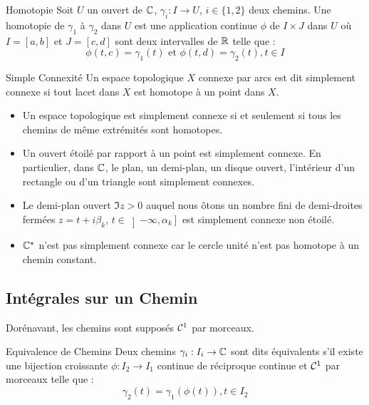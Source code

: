 \documentclass{cours}
\begin{document}
\begin{définition}{Homotopie}{}
    Soit $U$ un ouvert de $\mathbb{C}$, $\gamma_{i} : I \to U$, $i \in \{1, 2\}$ deux chemins. Une homotopie de $\gamma_{1}$ à $\gamma_{2}$ dans $U$ est une application continue $\phi$ de $I \times J$ dans $U$ où $I = \left[a, b\right]$ et $J = \left[c, d\right]$ sont deux intervalles de $\mathbb{R}$ telle que : 
    \begin{equation*}
        \phi\left(t, c\right) = \gamma_{1}\left(t\right) \text{ et } \phi\left(t, d\right) = \gamma_{2}\left(t\right), t\in I
    \end{equation*}
\end{définition}

\begin{définition}{Simple Connexité}{}
    Un espace topologique $X$ connexe par arcs est dit simplement connexe si tout lacet dans $X$ est homotope à un point dans $X$. 
\end{définition}

\begin{propositionfr}{}{}
    \begin{itemize}
        \item Un espace topologique est simplement connexe si et seulement si tous les chemins de même extrémités sont homotopes.
        \item Un ouvert étoilé par rapport à un point est simplement connexe. En particulier, dans $\mathbb{C}$, le plan, un demi-plan, un disque ouvert, l'intérieur d'un rectangle ou d'un triangle sont simplement connexes. 
        \item Le demi-plan ouvert $\Im z > 0$ auquel nous ôtons un nombre fini de demi-droites fermées $z = t +i\beta_{k}$, $t\in \left]-\infty, \alpha_{k}\right]$ est simplement connexe non étoilé. 
        \item $\mathbb{C}^{\star}$ n'est pas simplement connexe car le cercle unité n'est pas homotope à un chemin constant. 
    \end{itemize}
\end{propositionfr}

\subsection{Intégrales sur un Chemin}
Dorénavant, les chemins sont supposés $\mathcal{C}^{1}$ par morceaux. 

\begin{définition}{Equivalence de Chemins}{}
    Deux chemins $\gamma_{i} : I_{i} \to \mathbb{C}$ sont dits équivalents s'il existe une bijection croissante $\phi : I_{2} \to I_{1}$ continue de réciproque continue et $\mathcal{C}^{1}$ par morceaux telle que : 
    \begin{equation*}
        \gamma_{2}\left(t\right) = \gamma_{1}\left(\phi\left(t\right)\right), t\in I_{2}
    \end{equation*}
\end{définition}
\end{document}
